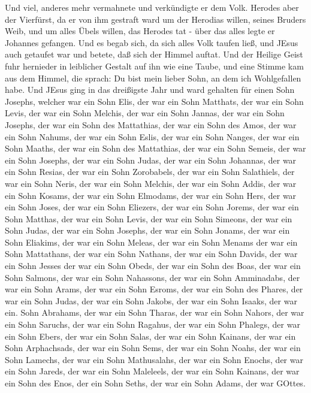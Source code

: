  Und viel, anderes mehr vermahnete und verkündigte er dem
Volk.  Herodes aber der Vierfürst, da er von ihm gestraft
ward um der Herodias willen, seines Bruders Weib, und um alles Übels
willen, das Herodes tat -  über das alles legte er Johannes
gefangen.  Und es begab sich, da sich alles Volk taufen
ließ, und JEsus auch getaufet war und betete, daß sich der Himmel
auftat.  Und der Heilige Geist fuhr hernieder in leiblicher
Gestalt auf ihn wie eine Taube, und eine Stimme kam aus dem Himmel, die
sprach: Du bist mein lieber Sohn, an dem ich Wohlgefallen habe.
 Und JEsus ging in das dreißigste Jahr und ward gehalten
für einen Sohn Josephs, welcher war ein Sohn Elis,  der war
ein Sohn Matthats, der war ein Sohn Levis, der war ein Sohn Melchis, der
war ein Sohn Jannas, der war ein Sohn Josephs,  der war ein
Sohn des Mattathias, der war ein Sohn des Amos, der war ein Sohn Nahums,
der war ein Sohn Eslis, der war ein Sohn Nanges,  der war
ein Sohn Maaths, der war ein Sohn des Mattathias, der war ein Sohn
Semeis, der war ein Sohn Josephs, der war ein Sohn Judas, 
der war ein Sohn Johannas, der war ein Sohn Resias, der war ein Sohn
Zorobabels, der war ein Sohn Salathiels, der war ein Sohn Neris,
 der war ein Sohn Melchis, der war ein Sohn Addis, der war
ein Sohn Kosams, der war ein Sohn Elmodams, der war ein Sohn Hers,
 der war ein Sohn Joses, der war ein Sohn Eliezers, der war
ein Sohn Jorems, der war ein Sohn Matthas, der war ein Sohn Levis,
 der war ein Sohn Simeons, der war ein Sohn Judas, der war
ein Sohn Josephs, der war ein Sohn Jonams, der war ein Sohn Eliakims,
 der war ein Sohn Meleas, der war ein Sohn Menams der war
ein Sohn Mattathans, der war ein Sohn Nathans, der war ein Sohn Davids,
 der war ein Sohn Jesses der war ein Sohn Obeds, der war
ein Sohn des Boas, der war ein Sohn Salmons, der war ein Sohn Nahassons,
 der war ein Sohn Amminadabs, der war ein Sohn Arams, der
war ein Sohn Esroms, der war ein Sohn des Phares, der war ein Sohn
Judas,  der war ein Sohn Jakobs, der war ein Sohn Isaaks,
der war ein. Sohn Abrahams, der war ein Sohn Tharas, der war ein Sohn
Nahors,  der war ein Sohn Saruchs, der war ein Sohn
Ragahus, der war ein Sohn Phalegs, der war ein Sohn Ebers, der war ein
Sohn Salas,  der war ein Sohn Kainans, der war ein Sohn
Arphachsads, der war ein Sohn Sems, der war ein Sohn Noahs, der war ein
Sohn Lamechs,  der war ein Sohn Mathusalahs, der war ein
Sohn Enochs, der war ein Sohn Jareds, der war ein Sohn Maleleels, der
war ein Sohn Kainans,  der war ein Sohn des Enos, der ein
Sohn Seths, der war ein Sohn Adams, der war GOttes.

